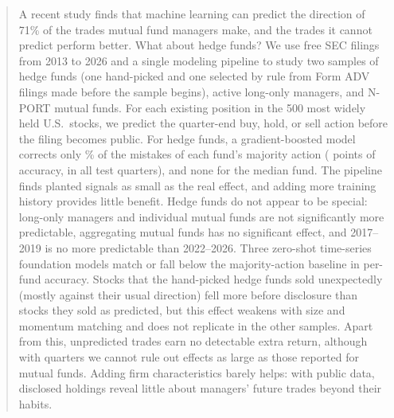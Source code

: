 \begin{abstract}
A recent study finds that machine learning can predict the direction of 71\%
of the trades mutual fund managers make, and the trades it cannot predict perform better. What about
hedge funds? We use free SEC filings from 2013 to 2026 and a single modeling
pipeline to study two samples of hedge funds (one hand-picked and one selected
by rule from Form ADV filings made before the sample begins), active long-only
managers, and N-PORT mutual funds. For each existing position in the 500 most
widely held U.S.\ stocks, we predict the quarter-end buy, hold, or sell action
before the filing becomes public. For hedge funds, a gradient-boosted model
corrects only \errredM\% of the mistakes of each fund's majority action
(\gainM{} points of accuracy, in all \dmposM{} test quarters), and none for the median fund. The pipeline finds
planted signals as small as the real effect, and adding more training history provides
little benefit. Hedge funds do not appear to be special: long-only managers and
individual mutual funds are not significantly more predictable, aggregating
mutual funds has no significant effect, and 2017--2019 is no more predictable
than 2022--2026. Three zero-shot time-series foundation models match or fall below the
majority-action baseline in per-fund accuracy. Stocks that the
hand-picked hedge funds sold unexpectedly (mostly against their usual direction) fell more before disclosure than
stocks they sold as predicted, but this effect weakens with size and momentum
matching and does not replicate in the other samples. Apart from this,
unpredicted trades earn no detectable extra return, although with \rqthreequartersM{}
quarters we cannot rule out effects as large as those reported for mutual
funds. Adding \firmn{} firm characteristics barely helps: with public data,
disclosed holdings reveal little about managers' future trades beyond their
habits.
\end{abstract}
